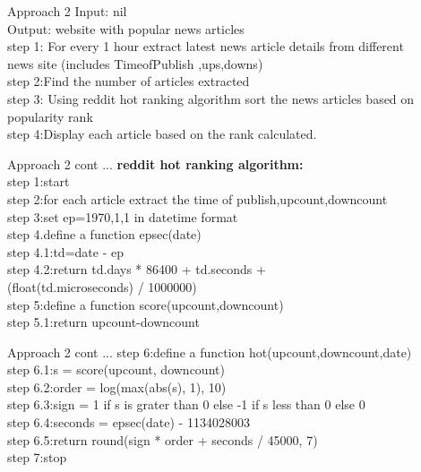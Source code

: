 \documentclass{beamer}
\begin{document}
	\begin{frame}{Approach 2}
	\footnotesize
	\Large{Input: nil \\
	Output: website with popular news articles\\}
	\vspace{.2cm}
	\footnotesize
	\Large{step 1: For every 1 hour extract latest news article details from different\\ \hspace{1.2mm} news site 
	(includes TimeofPublish ,ups,downs)\\
	step 2:Find the number of articles extracted\\
	step 3: Using reddit hot ranking algorithm sort the news articles based on popularity rank\\
	step 4:Display each article based on the rank calculated.\\}
	\vspace{0.5cm}
	\end{frame}
	\begin{frame}{Approach 2 cont ...}
	\textbf{\Large{reddit hot ranking algorithm:}}\\
	\Large{step 1:start\\
	step 2:for each article extract the time of publish,upcount,downcount\\
	step 3:set ep=1970,1,1 in datetime format\\
	step 4.define a function epsec(date)\\
	\hspace{.3cm}step 4.1:td=date - ep\\
	\hspace{.3cm}step 4.2:return td.days * 86400 + td.seconds +\\ \hspace{.8cm}(float(td.microseconds) / 1000000)\\
	step 5:define a function score(upcount,downcount)\\
	\hspace{.3cm}step 5.1:return upcount-downcount\\}
    \end{frame}
    \begin{frame}{Approach 2 cont ...}
    \Large{step 6:define a function hot(upcount,downcount,date)\\
    \hspace{.3cm}step 6.1:s = score(upcount, downcount)\\
    \hspace{.3cm}step 6.2:order = log(max(abs(s), 1), 10)\\
    \hspace{.3cm}step 6.3:sign = 1 if s is grater than 0 else -1 if s less than 0 else 0\\
    \hspace{.3cm}step 6.4:seconds = epsec(date) - 1134028003\\
    \hspace{.3cm}step 6.5:return round(sign * order + seconds / 45000, 7)\\
    step 7:stop}
    \end{frame}
	
\end{document}

